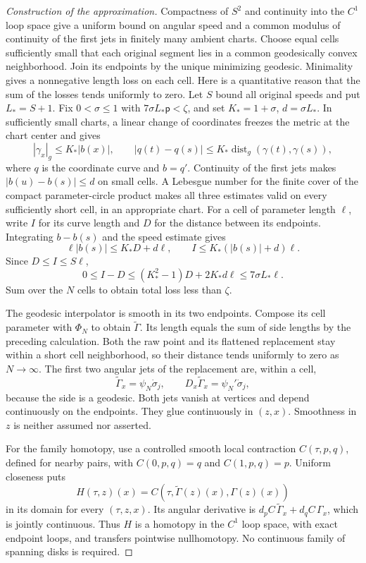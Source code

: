 \begin{proof}[Construction of the approximation]
Compactness of $S^2$ and continuity into the $C^1$ loop space give a uniform
bound on angular speed and a common modulus of continuity of the first
jets in finitely many ambient charts.  Choose equal cells sufficiently
small that each original segment lies in a common geodesically convex
neighborhood.  Join its endpoints by the unique minimizing geodesic.
Minimality gives a nonnegative length loss on each cell.
Here is a quantitative reason that the sum of the losses tends
uniformly to zero.  Let $S$ bound all original speeds and put
$L_*=S+1$.  Fix $0<\sigma\leq1$ with
$7\sigma L_*\mathsf p<\zeta$, and set $K_*=1+\sigma$,
$d=\sigma L_*$.  In sufficiently small charts, a linear change
of coordinates freezes the metric at the chart center and gives
\[
 |\gamma_x|_g\leq K_*|b(x)|,\qquad
 |q(t)-q(s)|\leq K_*\operatorname{dist}_g(\gamma(t),\gamma(s)),
\]
where $q$ is the coordinate curve and $b=q'$.
Continuity of the first jets makes $|b(u)-b(s)|\leq d$
on small cells.  A Lebesgue number for the finite cover of the
compact parameter-circle product makes all three estimates
valid on every sufficiently short cell, in an appropriate chart.
For a cell of parameter length $\ell$, write $I$ for its
curve length and $D$ for the distance between its endpoints.
Integrating $b-b(s)$ and the speed estimate gives
\[
 \ell|b(s)|\leq K_*D+d\ell,\qquad
 I\leq K_*(|b(s)|+d)\ell.
\]
Since $D\leq I\leq S\ell$,
\[
 0\leq I-D\leq(K_*^2-1)D+2K_*d\ell
                         \leq7\sigma L_*\ell.
\]
Sum over the $N$ cells to obtain total loss less than $\zeta$.

The geodesic interpolator is smooth in its two endpoints.  Compose its
cell parameter with $\Phi_N$ to obtain $\widetilde\Gamma$.
Its length equals the sum of side lengths by the preceding calculation.
Both the raw point and its flattened replacement stay within a short
cell neighborhood, so their distance tends uniformly to zero as $N\to\infty$.
The first two angular jets of the replacement are, within a cell,
\[
 \widetilde\Gamma_x=\psi_N\dot\sigma_j,\qquad
 D_x\widetilde\Gamma_x=\psi_N'\dot\sigma_j,
\]
because the side is a geodesic.  Both jets vanish at vertices and depend
continuously on the endpoints.  They glue continuously in $(z,x)$.
Smoothness in $z$ is neither assumed nor asserted.

For the family homotopy, use a controlled smooth local contraction
$C(\tau,p,q)$, defined for nearby pairs, with
$C(0,p,q)=q$ and $C(1,p,q)=p$.  Uniform closeness puts
\[
 H(\tau,z)(x)=C(\tau,\widetilde\Gamma(z)(x),\Gamma(z)(x))
\]
in its domain for every $(\tau,z,x)$.  Its angular derivative is
$d_pC\,\widetilde\Gamma_x+d_qC\,\Gamma_x$, which is jointly continuous.
Thus $H$ is a homotopy in the $C^1$ loop space, with exact endpoint loops,
and transfers pointwise nullhomotopy.  No continuous family of spanning
disks is required.


\end{proof}
